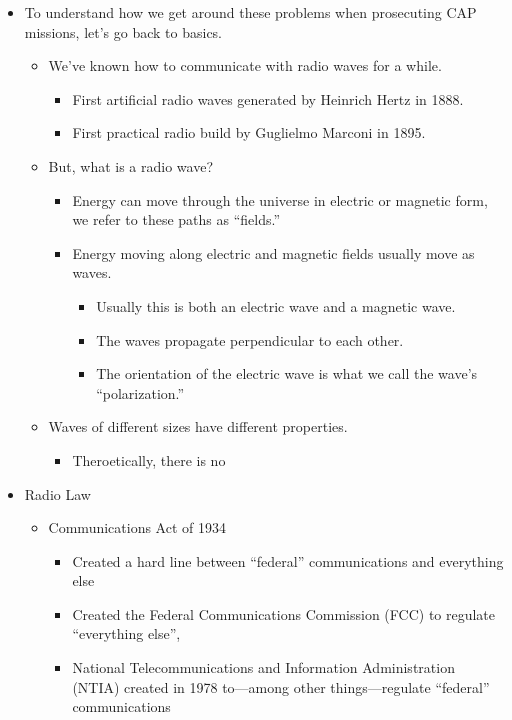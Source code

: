 \documentclass[talking]{usafpaper}
\begin{document}
\begin{itemize}
    \item To understand how we get around these problems when prosecuting CAP
    missions, let's go back to basics.
    \begin{itemize}
        \item We've known how to communicate with radio waves for a while.
        \begin{itemize}
            \item First artificial radio waves generated by Heinrich Hertz in
            1888.
            \item First practical radio build by Guglielmo Marconi in 1895.
        \end{itemize}

        \item But, what is a radio wave?
        \begin{itemize}
            \item Energy can move through the universe in electric or magnetic
            form, we refer to these paths as ``fields.''
            \item Energy moving along electric and magnetic fields usually move
            as waves.
            \begin{itemize}
                \item Usually this is both an electric wave and a magnetic
                wave.
                \item The waves propagate perpendicular to each other.
                \item The orientation of the electric wave is what we call the
                wave's ``polarization.''
            \end{itemize}
        \end{itemize}
        \item Waves of different sizes have different properties.
        \begin{itemize}
            \item Theroetically, there is no 
        \end{itemize}
    \end{itemize}

    \item Radio Law
    \begin{itemize}
        \item Communications Act of 1934
        \begin{itemize}
            \item Created a hard line between ``federal'' communications and
            everything else
            \item Created the Federal Communications Commission (FCC) to
            regulate ``everything else'',
            \item National Telecommunications and Information Administration
            (NTIA) created in 1978 to---among other things---regulate
            ``federal'' communications
        \end{itemize}


\end{itemize}
\end{itemize}
\end{document}
